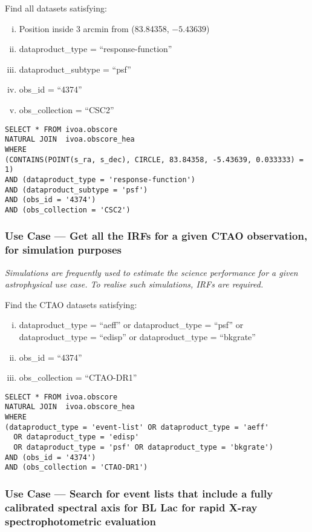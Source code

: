 \medskip
\noindent Find all datasets satisfying:
\begin{enumerate}[(i)]
  \item Position inside 3 arcmin from (83.84358, $-5.43639$)
  \item dataproduct\_type = ``response-function''
  \item dataproduct\_subtype = ``psf''
  \item obs\_id = ``4374''
  \item obs\_collection = ``CSC2''
\end{enumerate}

\begin{verbatim}
SELECT * FROM ivoa.obscore
NATURAL JOIN  ivoa.obscore_hea
WHERE
(CONTAINS(POINT(s_ra, s_dec), CIRCLE, 83.84358, -5.43639, 0.033333) = 1)
AND (dataproduct_type = 'response-function')
AND (dataproduct_subtype = 'psf')
AND (obs_id = '4374')
AND (obs_collection = 'CSC2')
\end{verbatim}


\subsubsection{Use Case --- Get all the \glspl{IRF} for a given CTAO observation, for simulation purposes}

{\em Simulations are frequently used to estimate the science performance for a given astrophysical use case. To realise such simulations, \glspl{IRF} are required. \/ }

\medskip
\noindent Find the CTAO datasets satisfying:
\begin{enumerate}[(i)]
  \item dataproduct\_type = ``aeff'' or dataproduct\_type = ``psf'' or dataproduct\_type = ``edisp'' or dataproduct\_type = ``bkgrate''
  \item obs\_id = ``4374''
  \item obs\_collection = ``CTAO-DR1''
\end{enumerate}

\begin{verbatim}
SELECT * FROM ivoa.obscore
NATURAL JOIN  ivoa.obscore_hea
WHERE
(dataproduct_type = 'event-list' OR dataproduct_type = 'aeff'
  OR dataproduct_type = 'edisp'
  OR dataproduct_type = 'psf' OR dataproduct_type = 'bkgrate')
AND (obs_id = '4374')
AND (obs_collection = 'CTAO-DR1')
\end{verbatim}


\subsubsection{Use Case --- Search for event lists that include a fully calibrated spectral axis for BL Lac for rapid X-ray spectrophotometric evaluation}

